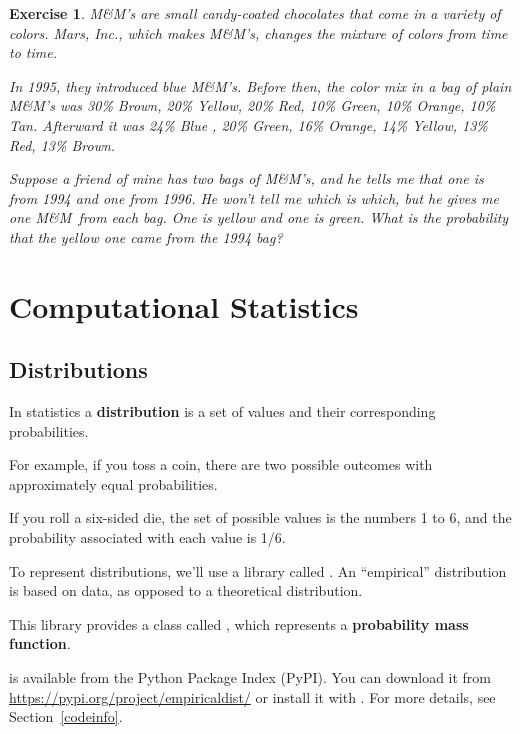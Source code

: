 \documentclass[12pt]{book}
\theoremstyle{exercise}
\newtheorem{exercise}{Exercise}[chapter]
\begin{document}
\newcommand{\MM}{M\&M}

\begin{exercise}

\MM's are small candy-coated chocolates that come in a variety of
colors.  Mars, Inc., which makes \MM's, changes the mixture of
colors from time to time.

In 1995, they introduced blue \MM's.  Before then, the color mix in
a bag of plain \MM's was 30\% Brown, 20\% Yellow, 20\% Red, 10\%
Green, 10\% Orange, 10\% Tan.  Afterward it was 24\% Blue , 20\%
Green, 16\% Orange, 14\% Yellow, 13\% Red, 13\% Brown.

Suppose a friend of mine has two bags of \MM's, and he tells me
that one is from 1994 and one from 1996.  He won't tell me which is
which, but he gives me one \MM~from each bag.  One is yellow and
one is green.  What is the probability that the yellow one came
from the 1994 bag?

\end{exercise}


\chapter{Computational Statistics}
\label{compstat}

\section{Distributions}
\label{distributions}

In statistics a {\bf distribution} is a set of values and their
corresponding probabilities.

For example, if you toss a coin, there are two possible outcomes with approximately equal probabilities.

If you roll a six-sided die, the set of possible
values is the numbers 1 to 6, and the probability associated
with each value is 1/6.

To represent distributions, we'll use a library called .
An ``empirical'' distribution is based on data, as opposed to a theoretical distribution.

This library provides a class called , which represents
a {\bf probability mass function}.


 is available from the Python Package Index (PyPI).
You can download it from \url{https://pypi.org/project/empiricaldist/} or install it with .
For more details, see Section~\ref{codeinfo}.
\end{document}
